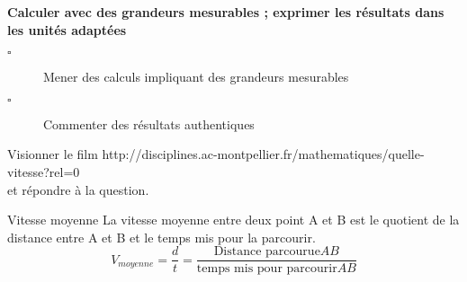 \documentclass[openany]{book}
\begin{document}
%
%
%
%
%
%
%
%
%
%
%
%

\Exe




\begin{seance}[Proportionnalité]
\textbf{Calculer avec des grandeurs mesurables ; exprimer les résultats dans les unités adaptées}
\begin{description}
\item[$\square$] Mener des calculs impliquant des grandeurs mesurables
\item[$\square$] Commenter des résultats authentiques
\end{description}
\end{seance}


\Exe

Visionner le film http://disciplines.ac-montpellier.fr/mathematiques/quelle-vitesse?rel=0 \\
et répondre  à la question.



\begin{DefT}{Vitesse moyenne}
La vitesse moyenne  entre deux point A et B est le quotient de la distance entre A et B et le temps mis pour la parcourir. $$ V_{moyenne}= \frac{d}{t} = \frac{\text{Distance parcourue}AB}{\text{temps mis pour parcourir} AB} $$
\end{DefT}
\end{document}

